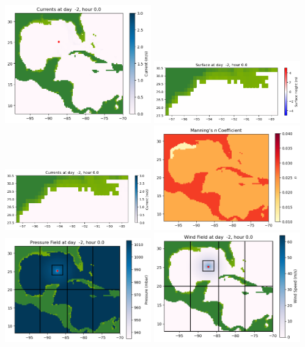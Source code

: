 \documentclass[11pt]{article}
\begin{document}
\includegraphics[width=0.475\textwidth]{frame0004fig1002.png}
\vskip 10pt 
\includegraphics[width=0.475\textwidth]{frame0004fig1003.png}
\includegraphics[width=0.475\textwidth]{frame0004fig1004.png}
\vskip 10pt 
\includegraphics[width=0.475\textwidth]{frame0004fig1005.png}
\includegraphics[width=0.475\textwidth]{frame0004fig1006.png}
\vskip 10pt 
\includegraphics[width=0.475\textwidth]{frame0004fig1007.png}
\end{document}

